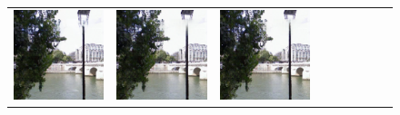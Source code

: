 \documentclass[10pt,journal,compsoc]{IEEEtran}
\begin{document}
\begin{figure}[hbt]
\begin{tabular}{ccccccccc}
		\includegraphics[width=.104\textwidth]{Ablation/MECNet/mecnets1}  &
		\includegraphics[width=.104\textwidth]{Ablation/MECNet/mecnetml1}&
		\includegraphics[width=.104\textwidth]{Ablation/MECNet/mecnet1} \\
		

\end{tabular}
\end{figure}
\end{document}
